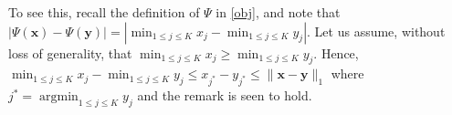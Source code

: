 \documentclass{article}
\newcommand{\balpha}{\boldsymbol{\alpha}}
\newcommand{\bTheta}{\boldsymbol{\Theta}}
\newtheorem{lemma}{Lemma}[section]
\newtheorem{remark}{\textbf{Remark}}
\begin{document}
To see this, recall the definition of $\Psi$ in \eqref{obj}, and note that $|\Psi(\bm{x})-\Psi(\bm{y})|=|\min_{1\le j\le K}x_j-\min_{1\le j\le K}y_j|$. Let us assume, without loss of generality, that $\min_{1\le j\le K}x_j\ge \min_{1\le j\le K}y_j$. Hence, $\min_{1\le j\le K}x_j-\min_{1\le j\le K}y_j\le x_{j^*}-y_{j^*}\le \|\bm{x}-\bm{y}\|_1$ where $j^* = \operatorname{argmin}_{1\le j\le K}y_j$ and the remark is seen to hold.





\end{document}
